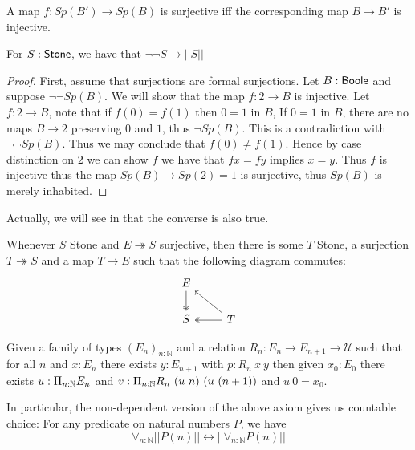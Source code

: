 \documentclass{../util/zariski-small}
\begin{document}
\begin{axiomNum}
  A map $f:Sp(B')\to Sp(B)$ is surjective iff the corresponding map $B \to B'$ is injective.
\end{axiomNum} 

\begin{lemma}\label{LemSurjectionsFormalToCompleteness}
 For $S:\mathsf{Stone}$, we have that $\neg \neg S \to || S ||$
\end{lemma}
\begin{proof}
  First, assume that surjections are formal surjections. 
  Let $B:\mathsf{Boole}$ and suppose $\neg \neg Sp(B)$. 
  We will show that the map $f:2\to B$ is injective. 
  Let $f:2 \to B$, note that if $f(0) = f(1)$ then $0=1$ in $B$, 
  If $0=1$ in $B$, there are no maps $B\to 2$ preserving $0$ and $1$, thus $\neg Sp(B)$. 
  This is a contradiction with $\neg \neg Sp(B)$. Thus we may conclude that $f(0)\neq f(1)$. 
  Hence by case distinction on $2$ we can show $f$ we have that $f x = f y$ implies $ x= y$. Thus 
  $f$ is injective thus the map $Sp(B) \to Sp(2) = 1$ is surjective, thus $Sp(B)$ is merely inhabited. 
\end{proof} 
Actually, we will see in  that the converse is also true. 

\begin{axiomNum}
  Whenever $S$ Stone and $E\twoheadrightarrow S$ surjective, then there is some $T$ Stone,
    a surjection $T \twoheadrightarrow S$ and a map $T\to E$ 
    such that the following diagram commutes:
    \begin{equation}\begin{tikzcd}
      E \arrow[d,""',two heads]\\
      S & \arrow[l, "", two heads] T\arrow[lu, ""']
    \end{tikzcd}\end{equation}  
\end{axiomNum} 

\begin{axiomNum}\label{axDependentChoice}
  Given a family of types $(E_n)_{n:\mathbb N}$ and 
  a relation 
  $R_n:E_n\rightarrow E_{n+1}\rightarrow {\mathcal U}$ such that
  for all $n$ and $x:E_n$ there exists $y:E_{n+1}$ with $p:R_n~x~y$ 
  then given $x_0:E_0$ there exists
  $u:\Pi_{n:\mathbb{N}}E_n$ and $v:\Pi_{n:\mathbb{N}}R_n~(u~n)~(u~(n+1))$ and $u~0 = x_0$.
\end{axiomNum}
\begin{corollary}
  In particular, the non-dependent version of the above axiom gives 
  us countable choice:
  For any predicate on natural numbers $P$, we have 
  \begin{equation}
    \forall_{n:\mathbb N} ||P(n) ||
    \leftrightarrow 
    || \forall_{n:\mathbb N} P(n) ||
  \end{equation}
\end{corollary}
\end{document}
